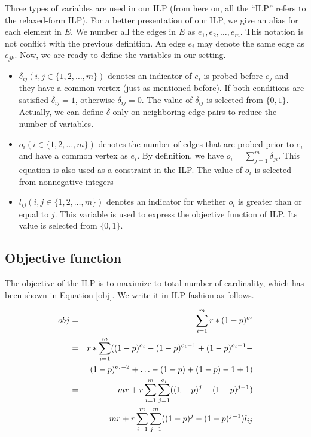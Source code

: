 \documentclass[letterpaper]{article}
\begin{document}
Three types of variables are used in our ILP (from here on, all the ``ILP'' refers to the relaxed-form ILP).
For a better presentation of our ILP, we give an alias for each element in $E$.
We number all the edges in $E$ as $e_1,e_2,\ldots,e_m$.
This notation is not conflict with the previous definition.
An edge $e_i$ may denote the same edge as $e_{jk}$.
Now, we are ready to define the variables in our setting.
\begin{itemize}
	\item $\delta_{ij}(i,j\in\{1,2,\ldots,m\})$ denotes an indicator of $e_i$ is probed before $e_j$ and they have a common vertex (just as mentioned before). If both conditions are satisfied $\delta_{ij}=1$, otherwise $\delta_{ij}=0$. The value of $\delta_{ij}$ is selected from $\{0,1\}$. Actually, we can define $\delta$ only on neighboring edge pairs to reduce the number of variables.
	\item $o_i(i\in\{1,2,\ldots,m\})$ denotes the number of edges that are probed prior to $e_i$ and have a common vertex as $e_i$. By definition, we have $o_i=\sum_{j=1}^{m}\delta_{ji}$. This equation is also used as a constraint in the ILP. The value of $o_i$ is selected from nonnegative integers
	\item $l_{ij}(i,j\in\{1,2,\ldots,m\})$ denotes an indicator for whether $o_i$ is greater than or equal to $j$. This variable is used to express the objective function of ILP. Its value is selected from $\{0,1\}$.
\end{itemize}

\subsection{Objective function}

The objective of the ILP is to maximize to total number of cardinality, which has been shown in Equation \ref{obj}.
We write it in ILP fashion as follows.

\begin{eqnarray}
	\scriptsize
	obj&=&\sum_{i=1}^{m}r*(1-p)^{o_i}\label{simple}\\
	&= & r*\sum_{i=1}^{m} ((1-p)^{o_i}-(1-p)^{o_{i}-1}+(1-p)^{o_{i}-1}-\nonumber\\
	&&(1-p)^{o_{i}-2}+\ldots-(1-p)+(1-p)-1+1)\nonumber\\
	&=& mr+r\sum_{i=1}^{m}\sum_{j=1}^{o_i}((1-p)^j-(1-p)^{j-1})\nonumber\\
	&=& mr+r\sum_{i=1}^{m}\sum_{j=1}^{m}((1-p)^j-(1-p)^{j-1})l_{ij}\label{fobj}
\end{eqnarray}
\end{document}
